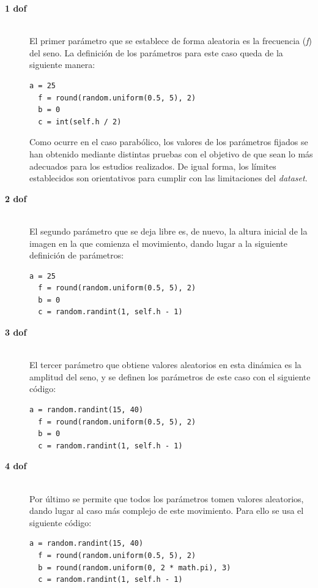 \begin{description}
\item[\textbf{1 \acrshort{dof}}] \hfill 
\vspace{10pt}
\\
El primer parámetro que se establece de forma aleatoria es la frecuencia (\textit{f}) del seno. La definición de los parámetros para este caso queda de la siguiente manera:
\vspace{10pt}
\begin{lstlisting}[frame=single]
  a = 25
  f = round(random.uniform(0.5, 5), 2)
  b = 0
  c = int(self.h / 2)
\end{lstlisting}

Como ocurre en el caso parabólico, los valores de los parámetros fijados se han obtenido mediante distintas pruebas con el objetivo de que sean lo más adecuados para los estudios realizados. De igual forma, los límites establecidos son orientativos para cumplir con las limitaciones del \textit{dataset}.
\vspace{10pt}
	
\item[\textbf{2 \acrshort{dof}}] \hfill
\vspace{10pt}
\\
El segundo parámetro que se deja libre es, de nuevo, la altura inicial de la imagen en la que comienza el movimiento, dando lugar a la siguiente definición de parámetros:
\begin{lstlisting}[frame=single]
  a = 25
  f = round(random.uniform(0.5, 5), 2)
  b = 0
  c = random.randint(1, self.h - 1)
\end{lstlisting}

\item[\textbf{3 \acrshort{dof}}] \hfill 
\vspace{10pt}
\\
El tercer parámetro que obtiene valores aleatorios en esta dinámica es la amplitud del seno, y se definen los parámetros de este caso con el siguiente código:
\vspace{10pt}
\begin{lstlisting}[frame=single]
  a = random.randint(15, 40)
  f = round(random.uniform(0.5, 5), 2)
  b = 0
  c = random.randint(1, self.h - 1)
\end{lstlisting}
\vspace{50pt}
\item[\textbf{4 \acrshort{dof}}] \hfill 
\vspace{10pt}
\\
Por último se permite que todos los parámetros tomen valores aleatorios, dando lugar al caso más complejo de este movimiento. Para ello se usa el siguiente código:
\vspace{10pt}
\begin{lstlisting}[frame=single]
  a = random.randint(15, 40)
  f = round(random.uniform(0.5, 5), 2)
  b = round(random.uniform(0, 2 * math.pi), 3)
  c = random.randint(1, self.h - 1)
\end{lstlisting}
\vspace{10pt}
\end{description}
